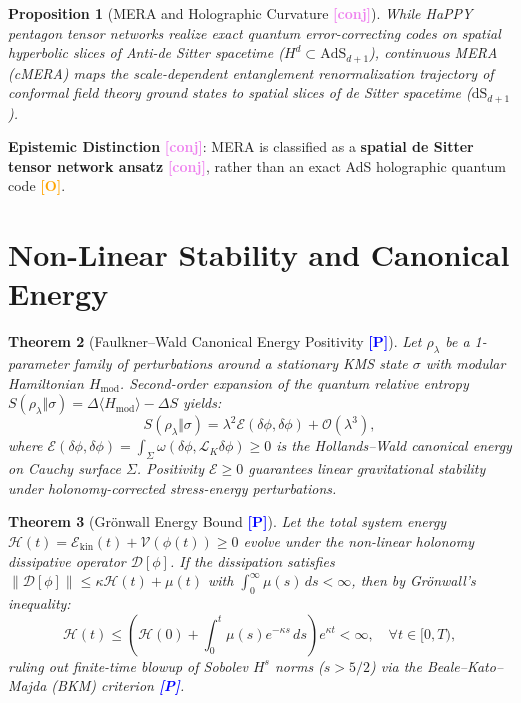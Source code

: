 \documentclass[aps,prd,twocolumn,superscriptaddress,nofootinbib,floatfix]{revtex4-2}
\newcommand{\tagP}{\textcolor{blue}{\textbf{[P]}}}
\newcommand{\tagC}{\textcolor{violet}{\textbf{[conj]}}}
\newcommand{\tagO}{\textcolor{orange}{\textbf{[O]}}}
\theoremstyle{plain}
\newtheorem{theorem}{Theorem}[section]
\newtheorem{proposition}[theorem]{Proposition}
\theoremstyle{definition}
\begin{document}
\begin{proposition}[MERA and Holographic Curvature \tagC]
\label{prop:mera}
While HaPPY pentagon tensor networks realize exact quantum error-correcting codes on spatial hyperbolic slices of Anti-de Sitter spacetime ($H^d \subset \mathrm{AdS}_{d+1}$), continuous MERA (cMERA) maps the scale-dependent entanglement renormalization trajectory of conformal field theory ground states to spatial slices of de Sitter spacetime ($\mathrm{dS}_{d+1}$).
\end{proposition}
\noindent \textbf{Epistemic Distinction} \tagC: MERA is classified as a \textbf{spatial de Sitter tensor network ansatz} \tagC, rather than an exact AdS holographic quantum code \tagO.

\section{Non-Linear Stability and Canonical Energy}
\label{sec:stability}

\begin{theorem}[Faulkner--Wald Canonical Energy Positivity \tagP]
\label{thm:canonical_energy}
Let $\rho_\lambda$ be a 1-parameter family of perturbations around a stationary KMS state $\sigma$ with modular Hamiltonian $H_{\mathrm{mod}}$. Second-order expansion of the quantum relative entropy $S(\rho_\lambda \Vert \sigma) = \Delta \langle H_{\mathrm{mod}} \rangle - \Delta S$ yields:
\begin{equation}
S(\rho_\lambda \Vert \sigma) = \lambda^2 \mathcal{E}(\delta \phi, \delta \phi) + \mathcal{O}(\lambda^3),
\end{equation}
where $\mathcal{E}(\delta \phi, \delta \phi) = \int_\Sigma \omega(\delta \phi, \mathcal{L}_K \delta \phi) \ge 0$ is the Hollands--Wald canonical energy on Cauchy surface $\Sigma$. Positivity $\mathcal{E} \ge 0$ guarantees linear gravitational stability under holonomy-corrected stress-energy perturbations.
\end{theorem}

\begin{theorem}[Gr\"{o}nwall Energy Bound \tagP]
\label{thm:gronwall}
Let the total system energy $\mathcal{H}(t) = \mathcal{E}_{\mathrm{kin}}(t) + \mathcal{V}(\phi(t)) \ge 0$ evolve under the non-linear holonomy dissipative operator $\mathcal{D}[\phi]$. If the dissipation satisfies $\|\mathcal{D}[\phi]\| \le \kappa \mathcal{H}(t) + \mu(t)$ with $\int_0^\infty \mu(s)\,ds < \infty$, then by Gr\"{o}nwall's inequality:
\begin{equation}
\mathcal{H}(t) \le \left( \mathcal{H}(0) + \int_0^t \mu(s) e^{-\kappa s}\,ds \right) e^{\kappa t} < \infty, \quad \forall t \in [0, T),
\end{equation}
ruling out finite-time blowup of Sobolev $H^s$ norms ($s > 5/2$) via the Beale--Kato--Majda (BKM) criterion \tagP.
\end{theorem}
\end{document}
